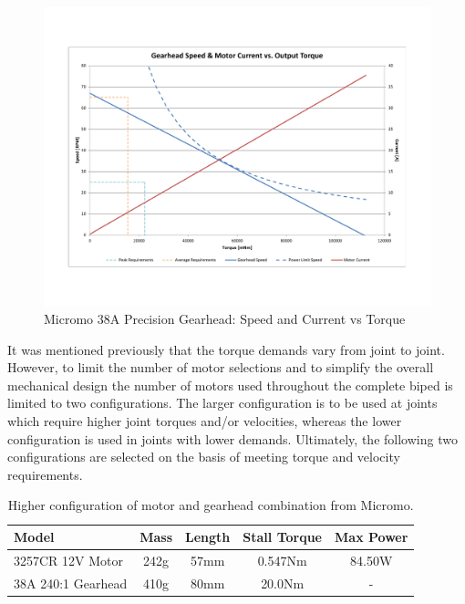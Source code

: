 \begin{figure}[!ht]
	\begin{center}
    \includegraphics[scale=0.6]{fig/design/gearhead1.pdf}
	\end{center}
  \caption{Micromo 38A Precision Gearhead: Speed and Current vs Torque}
\end{figure}

It was mentioned previously that the torque demands vary from joint to joint. However, to limit the number of motor selections and to simplify the overall mechanical design the number of motors used throughout the complete biped is limited to two configurations. The larger configuration is to be used at joints which require higher joint torques and/or velocities, whereas the lower configuration is used in joints with lower demands. Ultimately, the following two configurations are selected on the basis of meeting torque and velocity requirements. 


\begin{table}[!h]
  \centering
  \caption{Higher configuration of motor and gearhead combination from Micromo.}
    \begin{tabular}{lcccc}
    \addlinespace
    \toprule
    \textbf{Model} & \textbf{Mass} & \textbf{Length} & \textbf{Stall Torque} & \textbf{Max Power}\\
    \midrule
    3257CR 12V Motor	&	242g	&	57mm	&	0.547Nm		&	84.50W	\\
    38A 240:1 Gearhead	&	410g	&	80mm	&	20.0Nm		&	-	\\
    \bottomrule
    \end{tabular}%
  \label{tab:higherconfig}%
\end{table}%



